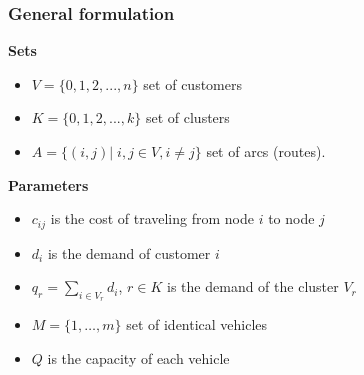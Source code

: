 \documentclass[11pt]{beamer}
\begin{document}
\begin{frame}[noframenumbering]
\begin{table}
\centering
\caption{Details of GVRPs}
\label{tab:problemdetails}
\end{table}
\end{frame}

\begin{frame}[noframenumbering]
\frametitle{General formulation}
\textbf{Sets}
\begin{itemize}
\item $V = \{0, 1, 2, ..., n\}$ set of customers
\item $K = \{0, 1, 2, ..., k\}$ set of clusters
\item $A = \{(i,j)|\; i,j\in V, i\ne j\}$ set of arcs (routes).
\end{itemize}
\textbf{Parameters}
\begin{itemize}
\item $c_{ij}$ is the cost of traveling from node $i$ to node $j$
\item $d_i$ is the demand of customer $i$
\item $q_r = \sum_{i \in V_r} d_i$, $r \in K$ is the demand of the cluster $V_r$
\item $M = \{1, \ldots,m\}$ set of identical vehicles
\item $Q$ is the capacity of each vehicle
\end{itemize}
\end{frame}
\end{document}
